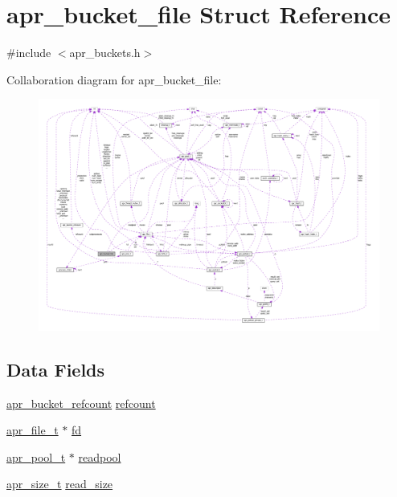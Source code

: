 \hypertarget{structapr__bucket__file}{}\section{apr\+\_\+bucket\+\_\+file Struct Reference}
\label{structapr__bucket__file}


{\ttfamily \#include $<$apr\+\_\+buckets.\+h$>$}



Collaboration diagram for apr\+\_\+bucket\+\_\+file\+:
\nopagebreak
\begin{figure}[H]
\begin{center}
\leavevmode
\includegraphics[width=350pt]{structapr__bucket__file__coll__graph}
\end{center}
\end{figure}
\subsection*{Data Fields}
\begin{DoxyCompactItemize}
\item 
\hyperlink{structapr__bucket__refcount}{apr\+\_\+bucket\+\_\+refcount} \hyperlink{structapr__bucket__file_ab0c123f34b85a07b601dc9794f8eed09}{refcount}
\item 
\hyperlink{structapr__file__t}{apr\+\_\+file\+\_\+t} $\ast$ \hyperlink{structapr__bucket__file_aa43154c0bc9d41ba4b0762c906de432f}{fd}
\item 
\hyperlink{structapr__pool__t}{apr\+\_\+pool\+\_\+t} $\ast$ \hyperlink{structapr__bucket__file_a61b5603482215f6c9ace7b26fa12b884}{readpool}
\item 
\hyperlink{group__apr__platform_gaaa72b2253f6f3032cefea5712a27540e}{apr\+\_\+size\+\_\+t} \hyperlink{structapr__bucket__file_a81c7e6646352fa03d4fb5a346dde4105}{read\+\_\+size}
\end{DoxyCompactItemize}



